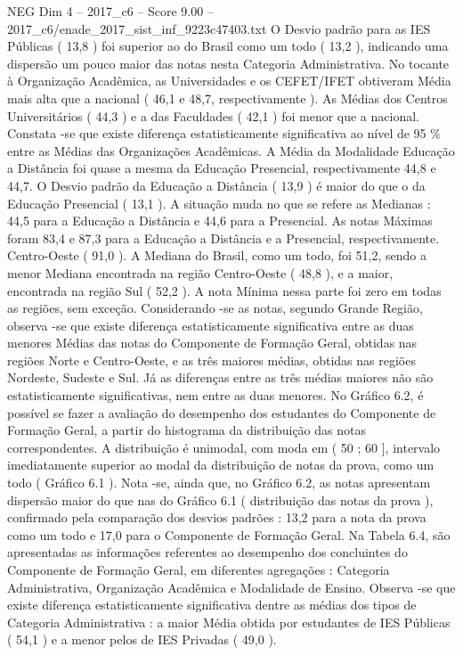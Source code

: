 \begin{textsample}{NEG Dim 4 – 2017\_c6 – Score 9.00 – 2017\_c6/enade\_2017\_sist\_inf\_9223c47403.txt}
O Desvio padrão para as IES Públicas ( 13,8 ) foi superior ao do Brasil como um todo ( 13,2 ), indicando uma dispersão um pouco maior das notas nesta Categoria Administrativa.
No tocante à Organização Acadêmica, as Universidades e os CEFET/IFET obtiveram Média mais alta que a nacional ( 46,1 e 48,7, respectivamente ).
As Médias dos Centros Universitários ( 44,3 ) e a das Faculdades ( 42,1 ) foi menor que a nacional.
Constata -se que existe diferença estatisticamente significativa ao nível de 95 \% entre as Médias das Organizações Acadêmicas.
A Média da Modalidade Educação a Distância foi quase a mesma da Educação Presencial, respectivamente 44,8 e 44,7.
O Desvio padrão da Educação a Distância ( 13,9 ) é maior do que o da Educação Presencial ( 13,1 ).
A situação muda no que se refere as Medianas : 44,5 para a Educação a Distância e 44,6 para a Presencial.
As notas Máximas foram 83,4 e 87,3 para a Educação a Distância e a Presencial, respectivamente.
Centro-Oeste ( 91,0 ).
A Mediana do Brasil, como um todo, foi 51,2, sendo a menor Mediana encontrada na região Centro-Oeste ( 48,8 ), e a maior, encontrada na região Sul ( 52,2 ).
A nota Mínima nessa parte foi zero em todas as regiões, sem exceção.
Considerando -se as notas, segundo Grande Região, observa -se que existe diferença estatisticamente significativa entre as duas menores Médias das notas do Componente de Formação Geral, obtidas nas regiões Norte e Centro-Oeste, e as três maiores médias, obtidas nas regiões Nordeste, Sudeste e Sul.
Já as diferenças entre as três médias maiores não são estatisticamente significativas, nem entre as duas menores.
No Gráfico 6.2, é possível se fazer a avaliação do desempenho dos estudantes do Componente de Formação Geral, a partir do histograma da distribuição das notas correspondentes.
A distribuição é unimodal, com moda em ( 50 ; 60 ], intervalo imediatamente superior ao modal da distribuição de notas da prova, como um todo ( Gráfico 6.1 ).
Nota -se, ainda que, no Gráfico 6.2, as notas apresentam dispersão maior do que nas do Gráfico 6.1 ( distribuição das notas da prova ), confirmado pela comparação dos desvios padrões : 13,2 para a nota da prova como um todo e 17,0 para o Componente de Formação Geral.
Na Tabela 6.4, são apresentadas as informações referentes ao desempenho dos concluintes do Componente de Formação Geral, em diferentes agregações : Categoria Administrativa, Organização Acadêmica e Modalidade de Ensino.
Observa -se que existe diferença estatisticamente significativa dentre as médias dos tipos de Categoria Administrativa : a maior Média obtida por estudantes de IES Públicas ( 54,1 ) e a menor pelos de IES Privadas ( 49,0 ).

\end{textsample}
